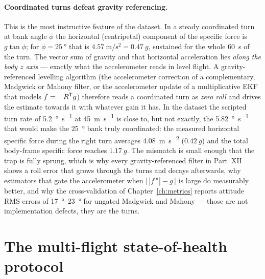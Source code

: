 \paragraph{Coordinated turns defeat gravity referencing.} This is the most instructive feature of
the dataset. In a steady coordinated turn at bank angle $\phi$ the horizontal (centripetal)
component of the specific force is $g\tan\phi$; for $\phi=\SI{25}{\degree}$ that is
$\SI{4.57}{\metre\per\second\squared} = \SI{0.47}{}g$, sustained for the whole \SI{60}{\second} of
the turn. The vector sum of gravity and that horizontal acceleration lies \emph{along the body $z$
axis} --- exactly what the accelerometer reads in level flight. A gravity-referenced levelling
algorithm (the accelerometer correction of a complementary, Madgwick or Mahony filter, or the
accelerometer update of a multiplicative EKF that models $f = -R^{\mathsf{T}} g$) therefore reads a
coordinated turn as \emph{zero roll} and drives the estimate towards it with whatever gain it has.
In the dataset the scripted turn rate of \SI{5.2}{\degree\per\second} at
\SI{45}{\metre\per\second} is close to, but not exactly, the \SI{5.82}{\degree\per\second} that
would make the \SI{25}{\degree} bank truly coordinated: the measured horizontal specific force
during the right turn averages \SI{4.08}{\metre\per\second\squared} ($\SI{0.42}{}g$) and the total
body-frame specific force reaches $\SI{1.17}{}g$. The mismatch is small enough that the trap is
fully sprung, which is why every gravity-referenced filter in Part~XII shows a roll error that grows
through the turns and decays afterwards, why estimators that gate the accelerometer when
$\bigl|\,|f^{\text{m}}| - g\,\bigr|$ is large do measurably better, and why the cross-validation of
Chapter~\ref{ch:metrics} reports attitude RMS errors of \SIrange{17}{23}{\degree} for ungated
Madgwick and Mahony --- those are not implementation defects, they are the turns.


\section{The multi-flight state-of-health protocol}
\label{sec:ds-soh}

